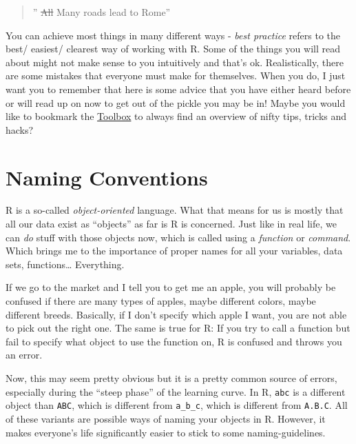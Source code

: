 \documentclass[
]{book}
\begin{document}
\begin{quote}
'' \st{All} Many roads lead to Rome''
\end{quote}

You can achieve most things in many different ways - \emph{best practice} refers to the best/ easiest/ clearest way of working with R.
Some of the things you will read about might not make sense to you intuitively and that's ok.
Realistically, there are some mistakes that everyone must make for themselves.
When you do, I just want you to remember that here is some advice that you have either heard before or will read up on now to get out of the pickle you may be in!
Maybe you would like to bookmark the \hyperref[toolbox]{Toolbox} to always find an overview of nifty tips, tricks and hacks?

\section{Naming Conventions}\label{varnames}

R is a so-called \emph{object-oriented} language.
What that means for us is mostly that all our data exist as ``objects'' as far is R is concerned.
Just like in real life, we can \emph{do} stuff with those objects now, which is called using a \emph{function} or \emph{command}.
Which brings me to the importance of proper names for all your variables, data sets, functions\ldots{}
Everything.

If we go to the market and I tell you to get me an apple, you will probably be confused if there are many types of apples, maybe different colors, maybe different breeds.
Basically, if I don't specify which apple I want, you are not able to pick out the right one.
The same is true for R: If you try to call a function but fail to specify what object to use the function on, R is confused and throws you an error.

Now, this may seem pretty obvious but it is a pretty common source of errors, especially during the ``steep phase'' of the learning curve.
In R, \texttt{abc} is a different object than \texttt{ABC}, which is different from \texttt{a\_b\_c}, which is different from \texttt{A.B.C}. All of these variants are possible ways of naming your objects in R.
However, it makes everyone's life significantly easier to stick to some naming-guidelines.
\end{document}
